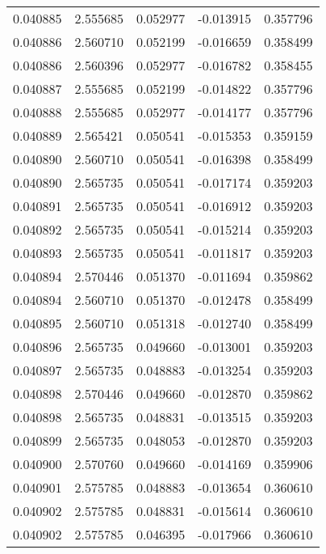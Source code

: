 \begin{tabular}{lrrrr}
0.040885    &  2.555685 &  0.052977 & -0.013915 &             0.357796 \\
0.040886    &  2.560710 &  0.052199 & -0.016659 &             0.358499 \\
0.040886    &  2.560396 &  0.052977 & -0.016782 &             0.358455 \\
0.040887    &  2.555685 &  0.052199 & -0.014822 &             0.357796 \\
0.040888    &  2.555685 &  0.052977 & -0.014177 &             0.357796 \\
0.040889    &  2.565421 &  0.050541 & -0.015353 &             0.359159 \\
0.040890    &  2.560710 &  0.050541 & -0.016398 &             0.358499 \\
0.040890    &  2.565735 &  0.050541 & -0.017174 &             0.359203 \\
0.040891    &  2.565735 &  0.050541 & -0.016912 &             0.359203 \\
0.040892    &  2.565735 &  0.050541 & -0.015214 &             0.359203 \\
0.040893    &  2.565735 &  0.050541 & -0.011817 &             0.359203 \\
0.040894    &  2.570446 &  0.051370 & -0.011694 &             0.359862 \\
0.040894    &  2.560710 &  0.051370 & -0.012478 &             0.358499 \\
0.040895    &  2.560710 &  0.051318 & -0.012740 &             0.358499 \\
0.040896    &  2.565735 &  0.049660 & -0.013001 &             0.359203 \\
0.040897    &  2.565735 &  0.048883 & -0.013254 &             0.359203 \\
0.040898    &  2.570446 &  0.049660 & -0.012870 &             0.359862 \\
0.040898    &  2.565735 &  0.048831 & -0.013515 &             0.359203 \\
0.040899    &  2.565735 &  0.048053 & -0.012870 &             0.359203 \\
0.040900    &  2.570760 &  0.049660 & -0.014169 &             0.359906 \\
0.040901    &  2.575785 &  0.048883 & -0.013654 &             0.360610 \\
0.040902    &  2.575785 &  0.048831 & -0.015614 &             0.360610 \\
0.040902    &  2.575785 &  0.046395 & -0.017966 &             0.360610 \\

\end{tabular}
